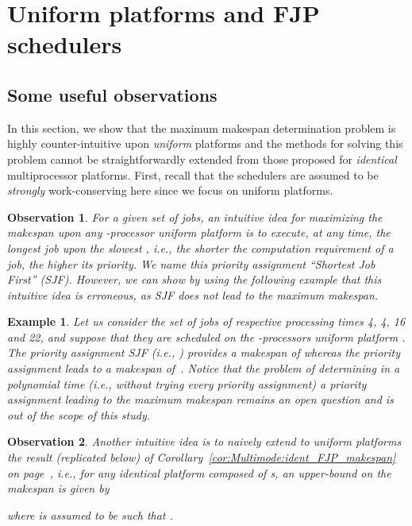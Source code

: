\documentclass{article}
\newtheorem{validity test}{Validity Test}
\newtheorem{Example}{Example}
\newtheorem{Observation}{Observation}
\begin{document}
\section{Uniform platforms and FJP schedulers}
\label{sec:Multimode:unif_FJP}

\subsection{Some useful observations}
\label{sec:Multimode:unif_observations}

In this section, we show that the maximum makespan determination problem is highly counter-intuitive upon \emph{uniform} platforms and the methods for solving this problem cannot be straightforwardly extended from those proposed for \emph{identical} multiprocessor platforms. First, recall that the schedulers are assumed to be \emph{strongly} work-conserving here since we focus on uniform platforms. 

\begin{Observation} 
For a given set of jobs, an intuitive idea for maximizing the makespan upon any -processor uniform platform is to execute, at any time, the longest job upon the slowest , i.e., the shorter the computation requirement of a job, the higher its priority. We name this priority assignment ``Shortest Job First'' (SJF). However, we can show by using the following example that this intuitive idea is {\em erroneous}, as SJF does not lead to the maximum makespan. 
\end{Observation}

\begin{Example}
Let us consider the set  of  jobs  of respective processing times 4, 4, 16 and 22, and suppose that they are scheduled on the -processors uniform platform . The priority assignment SJF (i.e., ) provides a makespan of  whereas the priority assignment  leads to a makespan of~. Notice that the problem of determining in a polynomial time (i.e., without trying every priority assignment) a priority assignment leading to the maximum makespan remains an open question and is out of the scope of this study. 
\end{Example}

\begin{Observation}
Another intuitive idea is to naively extend to uniform platforms the result (replicated below) of Corollary~\ref{cor:Multimode:ident_FJP_makespan} on page~\pageref{cor:Multimode:ident_FJP_makespan}, i.e., for any identical platform  composed of  s, an upper-bound on the makespan is given by

where  is assumed to be such that  . 
\end{Observation}
\end{document}
